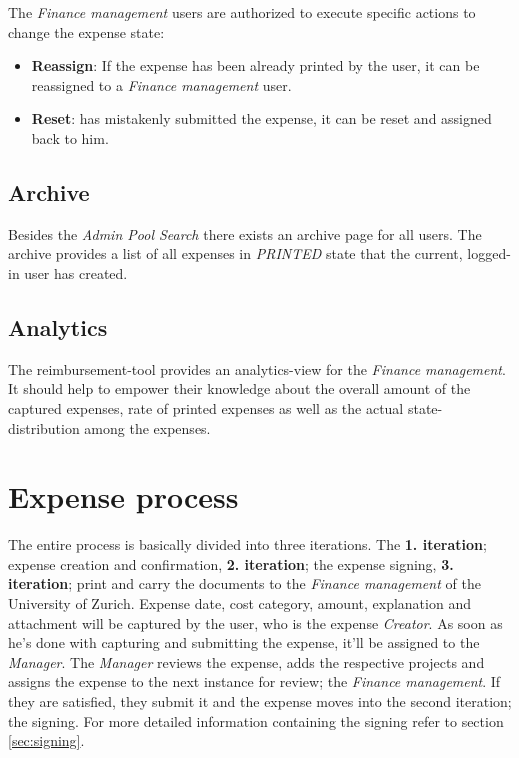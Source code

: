 The \textit{Finance management} users are authorized to execute specific actions to change the expense state:
\begin{itemize}
\item \textbf{Reassign}: If the expense has been already printed by the user, it can be reassigned to a \textit{Finance management} user.
\item \textbf{Reset}: has mistakenly submitted the expense, it can be reset and assigned back to him.
\end{itemize}

\subsection*{Archive}
Besides the \textit{Admin Pool Search} there exists an archive page for all users. The archive provides a list of all expenses in \textit{PRINTED} state that the current, logged-in user has created.

\subsection*{Analytics}
The reimbursement-tool provides an analytics-view for the \textit{Finance management}. It should help to empower their knowledge about the overall amount of the captured expenses, rate of printed expenses as well as the actual state-distribution among the expenses.


\section*{Expense process}
\label{sec:process}

The entire process is basically divided into three iterations. The \textbf{1. iteration}; expense creation and confirmation, \textbf{2. iteration}; the expense signing, \textbf{3. iteration}; print and carry the documents to the \textit{Finance management} of the University of Zurich.\newline
Expense date, cost category, amount, explanation and attachment will be captured by the user, who is the expense \textit{Creator}. As soon as he's done with capturing and submitting the expense, it'll be assigned to the \textit{Manager}. The \textit{Manager} reviews the expense, adds the respective projects and assigns the expense to the next instance for review; the \textit{Finance management}. If they are satisfied, they submit it and the expense moves into the second iteration; the signing. For more detailed information containing the signing refer to section \ref{sec:signing}.\newline

